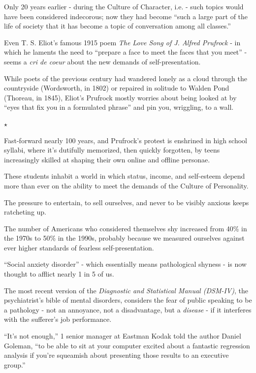 \documentclass[oneside]{article}
\numberwithin{equation}{section}
\begin{document}
Only 20 years earlier - during the Culture of Character, i.e. - such topics would have been considered indecorous; now they had become ``such a large part of the life of society that it has become a topic of conversation among all classes.''

%
Even T. S. Eliot's famous 1915 poem \textit{The Love Song of J. Alfred Prufrock} - in which he laments the need to ``prepare a face to meet the faces that you meet'' - seems a \textit{cri de coeur} about the new demands of self-presentation.

While poets of the previous century had wandered lonely as a cloud through the countryside (Wordsworth, in 1802) or repaired in solitude to Walden Pond (Thoreau, in 1845), Eliot's Prufrock mostly worries about being looked at by ``eyes that fix you in a formulated phrase'' and pin you, wriggling, to a wall.
\begin{center}
    $\star$
\end{center}
Fast-forward nearly 100 years, and Prufrock's protest is enshrined in high school syllabi, where it's dutifully memorized, then quickly forgotten, by teens increasingly skilled at shaping their own online and offline personae.

These students inhabit a world in which status, income, and self-esteem depend more than ever on the ability to meet the demands of the Culture of Personality.

The pressure to entertain, to sell ourselves, and never to be visibly anxious keeps ratcheting up.

The number of Americans who considered themselves shy increased from 40\% in the 1970s to 50\% in the 1990s, probably because we measured ourselves against ever higher standards of fearless self-presentation.

``Social anxiety disorder'' - which essentially means pathological shyness - is now thought to afflict nearly 1 in 5 of us.

The most recent version of the \textit{Diagnostic and Statistical Manual (DSM-IV)}, the psychiatrist's bible of mental disorders, considers the fear of public speaking to be a pathology - not an annoyance, not a disadvantage, but a \textit{disease} - if it interferes with the sufferer's job performance.

``It's not enough,'' 1 senior manager at Eastman Kodak told the author Daniel Goleman, ``to be able to sit at your computer excited about a fantastic regression analysis if you're squeamish about presenting those results to an executive group.''
\end{document}
